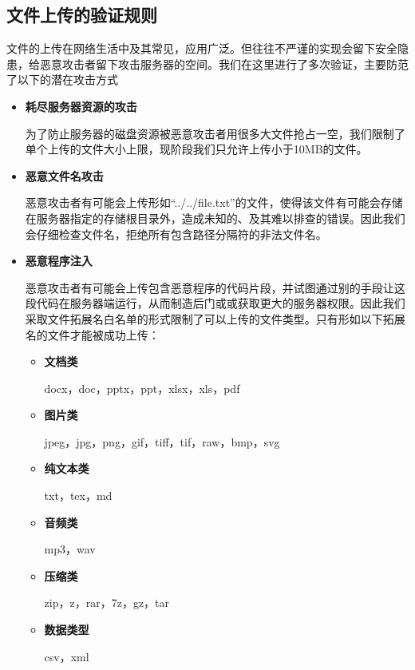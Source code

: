 \subsection{文件上传的验证规则}\label{sec:fileV}

文件的上传在网络生活中及其常见，应用广泛。但往往不严谨的实现会留下安全隐患，给恶意攻击者留下攻击服务器的空间。我们在这里进行了多次验证，主要防范了以下的潜在攻击方式
\begin{itemize}

	\item \textbf{耗尽服务器资源的攻击}
	
	为了防止服务器的磁盘资源被恶意攻击者用很多大文件抢占一空，我们限制了单个上传的文件大小上限，现阶段我们只允许上传小于10MB的文件。
	
	\item \textbf{恶意文件名攻击}
	
	恶意攻击者有可能会上传形如“../../file.txt”的文件，使得该文件有可能会存储在服务器指定的存储根目录外，造成未知的、及其难以排查的错误。因此我们会仔细检查文件名，拒绝所有包含路径分隔符的非法文件名。
	
	\item \textbf{恶意程序注入}
	
	恶意攻击者有可能会上传包含恶意程序的代码片段，并试图通过别的手段让这段代码在服务器端运行，从而制造后门或或获取更大的服务器权限。因此我们采取文件拓展名白名单的形式限制了可以上传的文件类型。只有形如以下拓展名的文件才能被成功上传：
	\begin{itemize}
		\item \textbf{文档类}
		
		docx，doc，pptx，ppt，xlsx，xls，pdf
		
		\item \textbf{图片类}
		
		jpeg，jpg，png，gif，tiff，tif，raw，bmp，svg
		
		\item \textbf{纯文本类}
		
		txt，tex，md
		
		\item \textbf{音频类}
		
		mp3，wav
		
		\item \textbf{压缩类}
		
		zip，z，rar，7z，gz，tar
		
		\item \textbf{数据类型}
		
		csv，xml
	\end{itemize}

\end{itemize}

